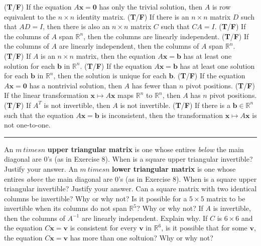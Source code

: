 \documentclass[11pt,answers]{exam} %
\renewcommand{\vec}[1]{\mathbf{#1}}
\begin{document}
\begin{questions}
    \question (\textbf{T}/\textbf{F}) If the equation $A\vec{x} = \vec{0}$ has only the trivial solution, then $A$ is row equivalent to the $n \times n$ identity matrix.
    \question (\textbf{T}/\textbf{F}) If there is an $n \times n$ matrix $D$ such that $AD = I$, then there is also an $n \times n$ matrix $C$ such that $CA = I$.
    \question (\textbf{T}/\textbf{F}) If the columns of $A$ span $\mathbb{R}^n$, then the columns are linearly independent.
    \question (\textbf{T}/\textbf{F}) If the columns of $A$ are linearly independent, then the columns of $A$ span $\mathbb{R}^n$.
    \question (\textbf{T}/\textbf{F}) If $A$ is an $n \times n$ matrix, then the equation $A\vec{x} = \vec{b}$ has at least one solution for each $\vec{b}$ in $\mathbb{R}^n$.
    \question (\textbf{T}/\textbf{F}) If the equation $A\vec{x} = \vec{b}$ has at least one solution for each $\vec{b}$ in $\mathbb{R}^n$, then the solution is unique for each $\vec{b}$.
    \question (\textbf{T}/\textbf{F}) If the equation $A\vec{x} = \vec{0}$ has a nontrivial solution, then $A$ has fewer than $n$ pivot positions.
    \question (\textbf{T}/\textbf{F}) If the linear transformation $\vec{x} \mapsto A\vec{x}$ maps $\mathbb{R}^n$ to $\mathbb{R}^n$, then $A$ has $n$ pivot positions.
    \question (\textbf{T}/\textbf{F}) If $A^T$ is not invertible, then $A$ is not invertible.
    \question (\textbf{T}/\textbf{F}) If there is a $\vec{b}\in\mathbb{R}^n$ such that the equation $A\vec{x}=\vec{b}$ is inconsistent, then the transformation $\vec{x} \mapsto A\vec{x}$ is not one-to-one.
    \begin{center}\rule{4in}{0.1mm}\end{center}
    \question An $m \ times n$ \textbf{upper triangular matrix} is one whose entires \emph{below} the main diagonal are 0's (as in Exercise 8). When is a square upper triangular invertible? Justify your answer.
    \question An $m \ times n$ \textbf{lower triangular matrix} is one whose entires \emph{above} the main diagonal are 0's (as in Exercise 8). When is a square upper triangular invertible? Justify your answer.
    \question Can a square matrix with two identical columns be invertible? Why or why not?
    \question Is it possible for a $5 \times 5$ matrix to be invertible when its columns do not span $\mathbb{R}^5$? Why or why not?
    \question If $A$ is invertible, then the columns of $A^{-1}$ are linearly independent. Explain why.
    \question If $C$ is $6 \times 6$ and the equation $C\vec{x} = \vec{v}$ is consistent for every $\vec{v}$ in $\mathbb{R}^6$, is it possible that for some $\vec{v}$, the equation $C\vec{x}=\vec{v}$ has more than one soltuion? Why or why not?

\end{questions}
\end{document}
